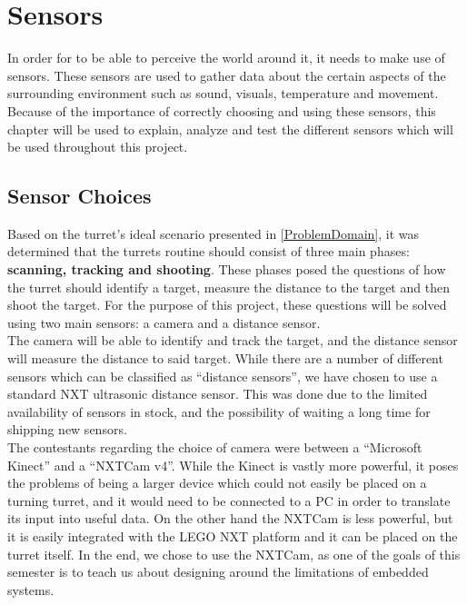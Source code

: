 \chapter{Sensors} \label{sensors}
In order for \name to be able to perceive the world around it, it needs to make
use of sensors. These sensors are used to gather data about the certain aspects
of the surrounding environment such as sound, visuals, temperature and
movement. Because of the importance of correctly choosing and using these
sensors, this chapter will be used to explain, analyze and test the different
sensors which will be used throughout this project.

\section{Sensor Choices}\label{SensorChoice}
Based on the turret's ideal scenario presented in \autoref{ProblemDomain}, it
was determined that the turrets routine should consist of three main phases:
\textbf{scanning, tracking and shooting}. These phases posed the questions of
how the turret should identify a target, measure the distance to the target and then
shoot the target. For the purpose of this project, these questions will be solved using
two main sensors: a camera and a distance sensor. \\
The camera will be able to
identify and track the target, and the distance sensor will measure the
distance to said target. While there are a number of different sensors which
can be classified as ``distance sensors'', we have chosen to use a standard NXT
ultrasonic distance sensor. This was done due to the limited availability of
sensors in stock, and the possibility of waiting a long time for shipping new
sensors.\\
The contestants regarding the choice of camera were between a
``Microsoft Kinect'' and a ``NXTCam v4''. While the Kinect is vastly more
powerful, it poses the problems of being a larger device which could not easily
be placed on a turning turret, and it would need to be connected to a PC in
order to translate its input into useful data. On the other hand the NXTCam is less
powerful, but it is easily integrated with the LEGO NXT platform and it can
be placed on the turret itself. In the end, we chose to use the NXTCam, as one
of the goals of this semester is to teach us about designing around the
limitations of embedded systems.





% 
% 
% 
% 
